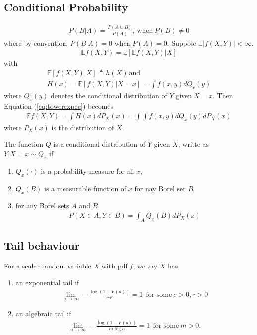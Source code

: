 \subsection{Conditional Probability}
\begin{gather}
    P(B|A)=\frac{P(A\cup{B})}{P(A)},~\text{when}~P(B)\neq 0
\end{gather}
where by convention, $P(B|A)=0$ when $P(A)=0$.
Suppose $\mathbb{E}|f(X,Y)|<\infty$,
\begin{gather}
    \mathbb{E}f(X,Y)=\mathbb{E}[\mathbb{E}f(X,Y)|X]\label{eq:towerexpec}
\end{gather}
with 
\begin{gather}
    \mathbb{E}[f(X,Y)|X]\triangleq h(X)~\text{and}\\
    H(x)=\mathbb{E}[f(X,Y)|X=x]=\int{f(x,y)}dQ_x(y)
\end{gather}
where $Q_x(y)$ denotes the conditional distribution of $Y$ given $X=x$. 
Then Equation (\ref{eq:towerexpec}) becomes
\begin{gather}
    \mathbb{E}f(X,Y)=\int{H(x)}dP_X(x)=\int\int{f(x,y)}dQ_x(y)dP_X(x)
\end{gather}
where $P_X(x)$ is the distribution of $X$.

\begin{definition}[NFFC]
    The function $Q$ is a conditional distribution of $Y$ given $X$, writte as $Y|X=x\sim Q_x$ if
    \begin{enumerate}[{(1)}]
        \item $Q_x(\cdot)$ is a probability measure for all $x$,
        \item $Q_x(B)$ is a measurable function of $x$ for nay Borel set $B$,
        \item for any Borel sets $A$ and $B$,
        \begin{gather}
            P(X\in A, Y\in B)=\int_A{Q_x(B)}dP_X(x)
        \end{gather}
    \end{enumerate}
\end{definition}


\subsection{Tail behaviour}
For a scalar random variable $X$ with pdf $f$, 
we say $X$ has
\begin{enumerate}
    \item an exponential tail if 
    \begin{gather}
        \lim_{a\to\infty}-\frac{\log{(1-F(a))}}{ca^r}=1~~\text{for some}~c>0,r>0
    \end{gather}
    \item an algebraic tail if 
    \begin{gather}
        \lim_{a\to\infty}-\frac{\log{(1-F(a))}}{m\log{a}}=1~~\text{for some}~m>0.
    \end{gather}
\end{enumerate}

